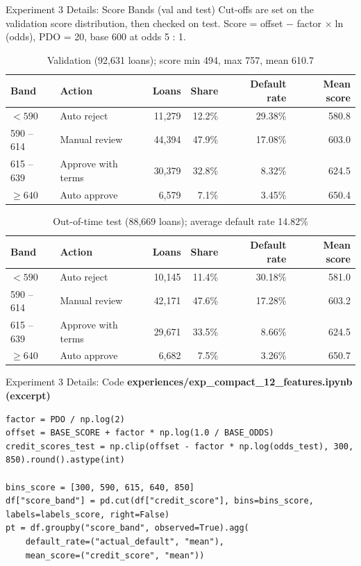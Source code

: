 \documentclass{beamer}
\begin{document}
\begin{frame}[fragile]{Experiment 3 Details: Score Bands (val and test)}
  \scriptsize Cut-offs are set on the validation score distribution, then checked on test. Score = offset $-$ factor $\times\ln$(odds), PDO = 20, base 600 at odds 5 : 1.
  \begin{table}
    \centering
    \tiny
    \caption{Validation (92,631 loans); score min 494, max 757, mean 610.7}
    \begin{tabular}{llrrrr}
      \hline
      \textbf{Band} & \textbf{Action} & \textbf{Loans} & \textbf{Share} & \textbf{Default rate} & \textbf{Mean score}\\
      \hline
      $<590$ & Auto reject & 11,279 & 12.2\% & 29.38\% & 580.8\\
      590 -- 614 & Manual review & 44,394 & 47.9\% & 17.08\% & 603.0\\
      615 -- 639 & Approve with terms & 30,379 & 32.8\% & 8.32\% & 624.5\\
      $\ge640$ & Auto approve & 6,579 & 7.1\% & 3.45\% & 650.4\\
      \hline
    \end{tabular}
  \end{table}
  \begin{table}
    \centering
    \tiny
    \caption{Out-of-time test (88,669 loans); average default rate 14.82\%}
    \begin{tabular}{llrrrr}
      \hline
      \textbf{Band} & \textbf{Action} & \textbf{Loans} & \textbf{Share} & \textbf{Default rate} & \textbf{Mean score}\\
      \hline
      $<590$ & Auto reject & 10,145 & 11.4\% & 30.18\% & 581.0\\
      590 -- 614 & Manual review & 42,171 & 47.6\% & 17.28\% & 603.2\\
      615 -- 639 & Approve with terms & 29,671 & 33.5\% & 8.66\% & 624.5\\
      $\ge640$ & Auto approve & 6,682 & 7.5\% & 3.26\% & 650.7\\
      \hline
    \end{tabular}
  \end{table}
\end{frame}

\begin{frame}[fragile]{Experiment 3 Details: Code}
  \textbf{\scriptsize experiences/exp\_compact\_12\_features.ipynb (excerpt)}
\begin{lstlisting}
factor = PDO / np.log(2)
offset = BASE_SCORE + factor * np.log(1.0 / BASE_ODDS)
credit_scores_test = np.clip(offset - factor * np.log(odds_test), 300, 850).round().astype(int)

bins_score = [300, 590, 615, 640, 850]
df["score_band"] = pd.cut(df["credit_score"], bins=bins_score, labels=labels_score, right=False)
pt = df.groupby("score_band", observed=True).agg(
    default_rate=("actual_default", "mean"),
    mean_score=("credit_score", "mean"))
\end{lstlisting}
\end{frame}
\end{document}
